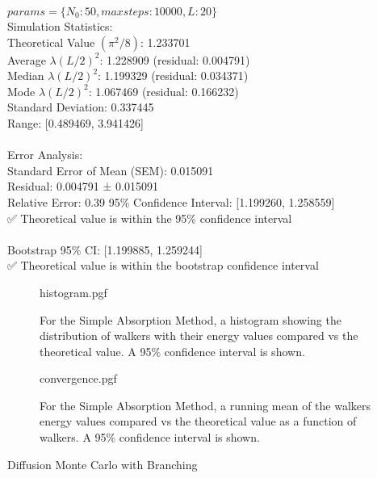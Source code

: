 \documentclass[reqno]{amsart}
\makeatletter
\renewcommand\subsection{\@startsection{subsection}{2}%
  \z@{.5\linespacing\@plus.7\linespacing}{-.5em}%
  {\normalfont\scshape\justify}}
\numberwithin{equation}{section}
\numberwithin{figure}{section}
\makeatother
\begin{document}

$params = \{N_0: 50, maxsteps: 10000, L: 20\}$ \\

Simulation Statistics:\\
Theoretical Value $(\pi^2/8)$: 1.233701\\
Average $\lambda (L/2)^2$: 1.228909 (residual: 0.004791)\\
Median $\lambda (L/2)^2$: 1.199329 (residual: 0.034371)\\
Mode $\lambda (L/2)^2$: 1.067469 (residual: 0.166232)\\
Standard Deviation: 0.337445\\
Range: [0.489469, 3.941426]\\
\\
Error Analysis:\\
Standard Error of Mean (SEM): 0.015091\\
Residual: 0.004791 ± 0.015091\\
Relative Error: 0.39%
95\% Confidence Interval: [1.199260, 1.258559]\\
✅ Theoretical value is within the 95\% confidence interval\\
\\
Bootstrap 95\% CI: [1.199885, 1.259244]\\
✅ Theoretical value is within the bootstrap confidence interval\\

\begin{figure}[h]
    \centering
    {histogram.pgf}
    \caption{For the Simple Absorption Method, a histogram showing the distribution of walkers with their energy values compared vs the theoretical value. A 95\% confidence interval is shown.}
    \label{fig:SA_histogram}
\end{figure}

\begin{figure}[h]
    \centering
    {convergence.pgf}
    \caption{For the Simple Absorption Method, a running mean of the walkers energy values compared vs the theoretical value as a function of walkers. A 95\% confidence interval is shown.}
    \label{fig:SA_convergence}
\end{figure}

\subsection{Diffusion Monte Carlo with Branching}
\end{document}

